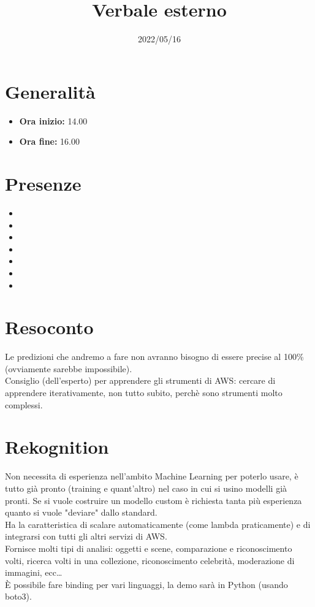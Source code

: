 \documentclass{classes/base}
\title{Verbale esterno}
\date{2022/05/16}
\author{\marcob}
\renewcommand{\maketitle}{
    
}
\begin{document}
    \maketitle

    \section*{Generalità}
    \begin{itemize}
        \item \textbf{Ora inizio:} 14.00
        \item \textbf{Ora fine:} 16.00
    \end{itemize}

    \section*{Presenze}
    \begin{itemize}
        \item \tommaso
        \item \marcob
        \item \marcov
        \item \angela
        \item \giulio
        \item \ruth
        \item \matteo
    \end{itemize}

    \section*{Resoconto}
    Le predizioni che andremo a fare non avranno bisogno di essere precise al 100\% (ovviamente sarebbe impossibile).\\
    Consiglio (dell'esperto) per apprendere gli strumenti di AWS: cercare di apprendere iterativamente, non tutto subito, perchè sono strumenti molto complessi.\\

    \section*{Rekognition}
    Non necessita di esperienza nell'ambito Machine Learning per poterlo usare, è tutto già pronto (training e quant'altro) nel caso in cui si usino modelli già pronti.
    Se si vuole costruire un modello custom è richiesta tanta più esperienza quanto si vuole "deviare" dallo standard.\\
    Ha la caratteristica di scalare automaticamente (come lambda praticamente) e di integrarsi con tutti gli altri servizi di AWS.\\
    Fornisce molti tipi di analisi: oggetti e scene, comparazione e riconoscimento volti, ricerca volti in una collezione, riconoscimento celebrità, moderazione di immagini, ecc… \\
    È possibile fare binding per vari linguaggi, la demo sarà in Python (usando boto3).
\end{document}

